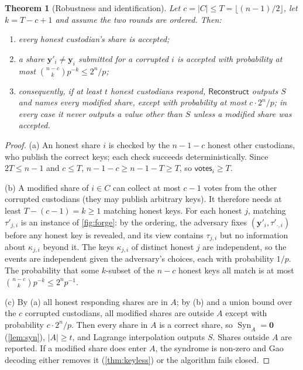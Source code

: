 \documentclass[11pt,a4paper]{article}
\theoremstyle{plain}
\newtheorem{theorem}{Theorem}
\theoremstyle{definition}
\newcommand{\Vote}{\mathsf{votes}}
\DeclareMathOperator{\Syn}{Syn}
\begin{document}
\begin{theorem}[Robustness and identification]\label{thm:robust}
Let $c=|C|\le T=\lfloor(n-1)/2\rfloor$, let $k=T-c+1$ and assume the two rounds are ordered. Then:
\begin{enumerate}[label=(\alph*)]
  \item every honest custodian's share is accepted;
  \item a share $\mathbf y'_i\ne\mathbf y_i$ submitted for a corrupted $i$ is accepted with
  probability at most $\binom{n-c}{k}p^{-k}\le 2^n/p$;
  \item consequently, if at least $t$ honest custodians respond, $\mathsf{Reconstruct}$ outputs $S$
  and names every modified share, except with probability at most $c\cdot2^n/p$; in every case it
  never outputs a value other than $S$ unless a modified share was accepted.
\end{enumerate}
\end{theorem}
\begin{proof}
(a) An honest share $i$ is checked by the $n-1-c$ honest other custodians, who publish the correct
keys; each check succeeds deterministically. Since $2T\le n-1$ and $c\le T$,
$n-1-c\ge n-1-T\ge T$, so $\Vote_i\ge T$.

(b) A modified share of $i\in C$ can collect at most $c-1$ votes from the other corrupted custodians
(they may publish arbitrary keys). It therefore needs at least $T-(c-1)=k\ge1$ matching honest keys.
For each honest $j$, matching $\tau'_{j,i}$ is an instance of \cref{fig:forge}: by the ordering, the
adversary fixes $(\mathbf y'_i,\tau'_{\cdot,i})$ before any honest key is revealed, and its view
contains $\tau_{j,i}$ but no information about $\kappa_{j,i}$ beyond it. The keys $\kappa_{j,i}$
of distinct honest $j$ are independent, so the events are independent given the adversary's
choices, each with probability $1/p$. The probability that some $k$-subset of the $n-c$ honest
keys all match is at most $\binom{n-c}{k}p^{-k}\le 2^{n}p^{-1}$.

(c) By (a) all honest responding shares are in $A$; by (b) and a union bound over the $c$
corrupted custodians, all modified shares are outside $A$ except with probability
$c\cdot2^n/p$. Then every share in $A$ is a correct share, so $\Syn_A=\mathbf 0$
(\cref{lem:syn}), $|A|\ge t$, and Lagrange interpolation outputs $S$. Shares outside $A$ are
reported. If a modified share does enter $A$, the syndrome is non-zero and Gao decoding either
removes it (\cref{thm:keyless}) or the algorithm fails closed.
\end{proof}
\end{document}
